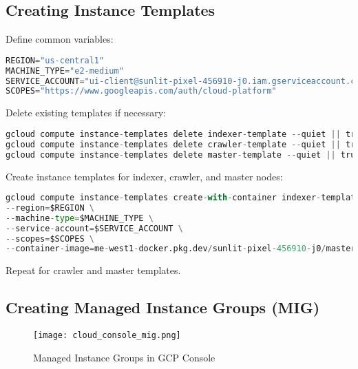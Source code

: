 \documentclass[12pt,a4paper]{report}
\begin{document}
\subsection{Creating Instance Templates}
Define common variables:
\begin{lstlisting}[language=Python]
REGION="us-central1"
MACHINE_TYPE="e2-medium"
SERVICE_ACCOUNT="ui-client@sunlit-pixel-456910-j0.iam.gserviceaccount.com"
SCOPES="https://www.googleapis.com/auth/cloud-platform"
\end{lstlisting}
Delete existing templates if necessary:
\begin{lstlisting}[language=Python]
gcloud compute instance-templates delete indexer-template --quiet || true
gcloud compute instance-templates delete crawler-template --quiet || true
gcloud compute instance-templates delete master-template --quiet || true
\end{lstlisting}
Create instance templates for indexer, crawler, and master nodes:
\begin{lstlisting}[language=Python]
gcloud compute instance-templates create-with-container indexer-template \
--region=$REGION \
--machine-type=$MACHINE_TYPE \
--service-account=$SERVICE_ACCOUNT \
--scopes=$SCOPES \
--container-image=me-west1-docker.pkg.dev/sunlit-pixel-456910-j0/master-node/indexer-node:latest    
\end{lstlisting}
Repeat for crawler and master templates.
\subsection{Creating Managed Instance Groups (MIG)}
\begin{figure}[htb!]
    \centering
    \texttt{[image: cloud\_console\_mig.png]}
    \caption{Managed Instance Groups in GCP Console}
    \label{fig:mig-console}
\end{figure}
\end{document}
